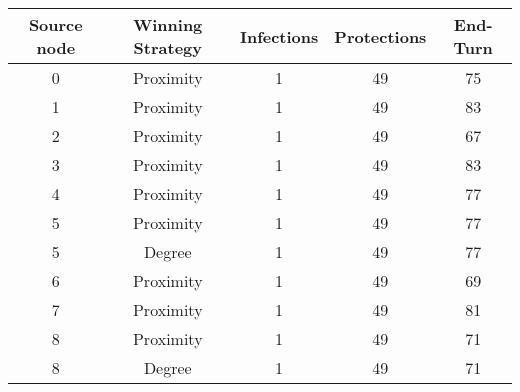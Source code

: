 \documentclass[results.tex]{subfiles}
\begin{document}
    \begin{center}
        \begin{tabular}{| c || c | c | c | c |}
            \hline
            {\bfseries Source node} & {\bfseries Winning Strategy} & {\bfseries Infections} & {\bfseries Protections}
            & {\bfseries End-Turn}
            \\  %
            \hline\hline
            0                       & Proximity                    & 1                      & 49                      & 75                   \\
            \hline
            1                       & Proximity                    & 1                      & 49                      & 83                   \\
            \hline
            2                       & Proximity                    & 1                      & 49                      & 67                   \\
            \hline
            3                       & Proximity                    & 1                      & 49                      & 83                   \\
            \hline
            4                       & Proximity                    & 1                      & 49                      & 77                   \\
            \hline
            5                       & Proximity                    & 1                      & 49                      & 77                   \\
            \hline
            5                       & Degree                       & 1                      & 49                      & 77                   \\
            \hline
            6                       & Proximity                    & 1                      & 49                      & 69                   \\
            \hline
            7                       & Proximity                    & 1                      & 49                      & 81                   \\
            \hline
            8                       & Proximity                    & 1                      & 49                      & 71                   \\
            \hline
            8                       & Degree                       & 1                      & 49                      & 71                   \\

\end{tabular}
\end{center}
\end{document}
